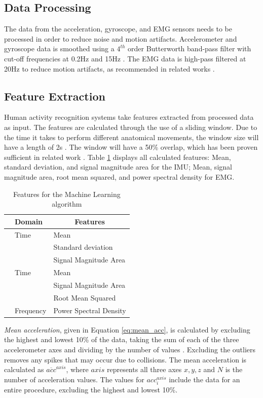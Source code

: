 \subsection{Data Processing}
\label{sec:Approach:Data-Processing}
The data from the acceleration, gyroscope, and EMG sensors needs to be processed in order to reduce noise and motion artifacts. Accelerometer and gyroscope data is smoothed using a $4^{th}$ order Butterworth band-pass filter with cut-off frequencies at 0.2Hz and 15Hz \cite{1419604}. The EMG data is high-pass filtered at 20Hz to reduce motion artifacts, as recommended in related works \cite{DeLuca2010}.

\subsection{Feature Extraction}
\label{sec:Approach:Feature-Extraction}
Human activity recognition systems take features extracted from processed data as input. The features are calculated through the use of a sliding window. Due to the time it takes to perform different anatomical movements, the window size will have a length of 2s \cite{Dorfmeister2014}. The window will have a 50\% overlap, which has been proven sufficient in related work \cite{Wannenburg2016}. Table \ref{tab:features} displays all calculated features: Mean, standard deviation, and signal magnitude area for the IMU; Mean, signal magnitude area, root mean squared, and power spectral density for EMG.
\begin{table}[h]
	\centering
	\begin{tabular}{c|l|l}
		& \multicolumn{1}{l|}{Domain} & \multicolumn{1}{c}{Features} \\
		\hline
		\parbox[t]{2mm}{} & Time & Mean\\
		&& Standard deviation\\
		&& Signal Magnitude Area\\
		\hline
		\parbox[t]{2mm}{} & Time & Mean\\
		&& Signal Magnitude Area \\
		&& Root Mean Squared \\
		& Frequency & Power Spectral Density \\
	\end{tabular}
	\caption{Features for the Machine Learning algorithm}
	\label{tab:features}
\end{table}
\emph{Mean acceleration}, given in Equation \ref{eq:mean_acc}, is calculated by excluding the highest and lowest 10\% of the data, taking the sum of each of the three accelerometer axes and dividing by the number of values \cite{Totty2017}. Excluding the outliers removes any spikes that may occur due to collisions. The mean acceleration is calculated as $ \overline{acc}^{axis} $, where $axis$ represents all three axes $x,y,z$ and $N$ is the number of acceleration values. The values for $acc^{axis}_i$ include the data for an entire procedure, excluding the highest and lowest 10\%.
